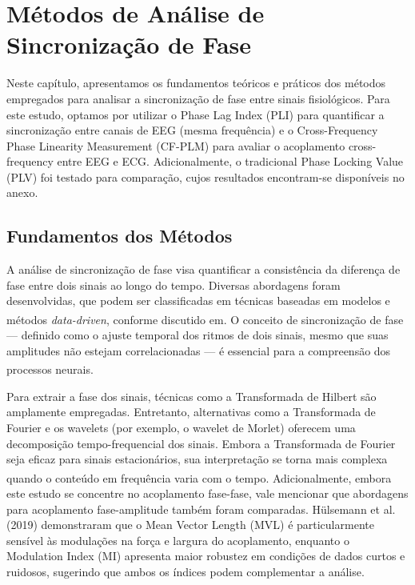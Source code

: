 \chapter{Métodos de Análise de Sincronização de Fase}
\label{chap:6_metodos_de_analise_de_sincronizacao_de_fase}

Neste capítulo, apresentamos os fundamentos teóricos e práticos dos métodos empregados para analisar a sincronização de fase entre sinais fisiológicos. Para este estudo, optamos por utilizar o Phase Lag Index (PLI) para quantificar a sincronização entre canais de EEG (mesma frequência) e o Cross-Frequency Phase Linearity Measurement (CF-PLM) para avaliar o acoplamento cross-frequency entre EEG e ECG. Adicionalmente, o tradicional Phase Locking Value (PLV) foi testado para comparação, cujos resultados encontram-se disponíveis no anexo.

\section{Fundamentos dos Métodos}

A análise de sincronização de fase visa quantificar a consistência da diferença de fase entre dois sinais ao longo do tempo. Diversas abordagens foram desenvolvidas, que podem ser classificadas em técnicas baseadas em modelos e métodos \textit{data-driven}, conforme discutido em\textsuperscript{\cite{seraj2018}}. O conceito de sincronização de fase --- definido como o ajuste temporal dos ritmos de dois sinais, mesmo que suas amplitudes não estejam correlacionadas --- é essencial para a compreensão dos processos neurais\textsuperscript{\cite{seraj2018}}.

Para extrair a fase dos sinais, técnicas como a Transformada de Hilbert são amplamente empregadas. Entretanto, alternativas como a Transformada de Fourier e os wavelets (por exemplo, o wavelet de Morlet) oferecem uma decomposição tempo-frequencial dos sinais. Embora a Transformada de Fourier seja eficaz para sinais estacionários, sua interpretação se torna mais complexa quando o conteúdo em frequência varia com o tempo\textsuperscript{\cite{singh2024}}. Adicionalmente, embora este estudo se concentre no acoplamento fase-fase, vale mencionar que abordagens para acoplamento fase-amplitude também foram comparadas. Hülsemann et al. (2019) \cite{hulsemann2019quantification} demonstraram que o Mean Vector Length (MVL) é particularmente sensível às modulações na força e largura do acoplamento, enquanto o Modulation Index (MI) apresenta maior robustez em condições de dados curtos e ruidosos, sugerindo que ambos os índices podem complementar a análise.

